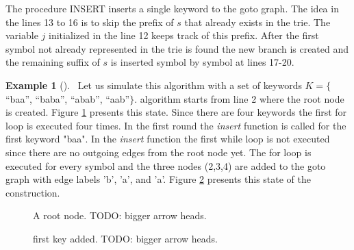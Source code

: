 \documentclass[english,twoside,censored,csm,algorithms-track-2020]{HYthesisML}
\theoremstyle{plain}
\theoremstyle{definition}
\newtheorem{example}[theorem]{Example}
\begin{document}
  The procedure \textsc{INSERT} inserts a single keyword to the goto graph. The idea in the lines
  13 to 16 is to skip the prefix of $s$ that already exists in the trie. The variable $j$ initialized
  in the line 12 keeps track of this prefix. After the first symbol not already represented in the
  trie is found the new branch is created and the remaining suffix of $s$ is inserted symbol by symbol
  at lines 17-20.

  \begin{example}[]~\label{exmp-goto}
  Let us simulate this algorithm with a set of keywords $K=\{$``baa'', ``baba'', ``abab'', ``aab''$\}$.
  algorithm starts from line 2 where the root node is created. Figure \ref{fig-ac-step1}
  presents this state. Since there are four keywords the first for loop is executed four times.
  In the first round the \textit{insert} function is called for the first keyword "baa".
  In the \textit{insert} function the first while loop is not executed since there are no
  outgoing edges from the root node yet. The for loop is executed for every symbol and the three
  nodes (2,3,4) are added to the goto graph with edge labels 'b', 'a', and 'a'.
  Figure \ref{fig-ac-step2} presents this state of the construction.


  \begin{figure}[h]
  \centering
  \caption{A root node. TODO: bigger arrow heads.} \label{fig-ac-step1}
  \end{figure}

  \begin{figure}[h]
  \centering
  \caption{first key added. TODO: bigger arrow heads.} \label{fig-ac-step2}
\end{figure}


\end{example}
\end{document}
